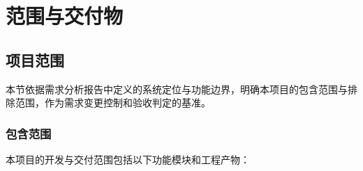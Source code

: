 \section{范围与交付物}

\subsection{项目范围}

本节依据需求分析报告中定义的系统定位与功能边界，明确本项目的包含范围与排除范围，作为需求变更控制和验收判定的基准。

\subsubsection{包含范围}

本项目的开发与交付范围包括以下功能模块和工程产物：

